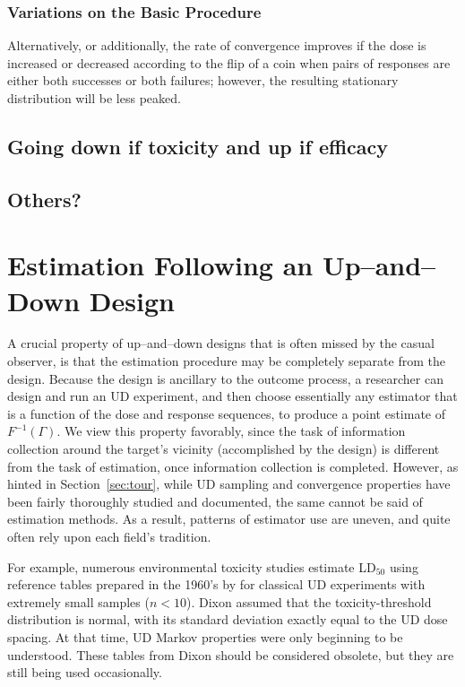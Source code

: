 \subsection{Variations on the Basic Procedure}
Alternatively, or additionally, the rate of convergence improves if the dose  is increased or decreased according to the flip of a coin when pairs of responses are either both successes or both failures; however, the resulting stationary distribution will be less peaked.

\section{Going down if toxicity and up if efficacy}
\section{Others?}

\chapter{Estimation Following an Up--and--Down Design}\label{sec:est}

A crucial property of up--and--down designs that is often missed by the casual observer, is that the estimation procedure may be completely separate from the design. Because the design is ancillary \citep{Rose:Flou:Durh:asym:1997} to the outcome process, a researcher can design and run an UD experiment, and then choose essentially any estimator that is a function of the dose and response sequences, to produce a point  estimate of $F^{-1}(\Gamma)$.  We view this property favorably, since the task of information collection around the target's vicinity (accomplished by the design) is different from the task of estimation, once information collection is completed. However, as hinted in Section~\ref{sec:tour}, while UD sampling and convergence properties have been fairly thoroughly studied and documented, the same cannot be said of estimation methods.   As a result, patterns of estimator use are uneven, and quite often rely upon each field's tradition.

For example, numerous environmental toxicity studies \citep{Lich:updo:1998,Sund:Patr:Jull:Warn:Use:2004,Sween:etal:canines:2010} estimate LD$_{50}$ using reference tables prepared in the 1960's by \cite{Dixo:up-a:1965} for classical UD experiments with extremely small samples ($n<10$). Dixon assumed that the toxicity-threshold distribution is normal, with its standard deviation exactly equal to the UD dose spacing. At that time, UD Markov properties were only beginning to be understood. These tables from Dixon should be considered obsolete, but they are still being used occasionally.

